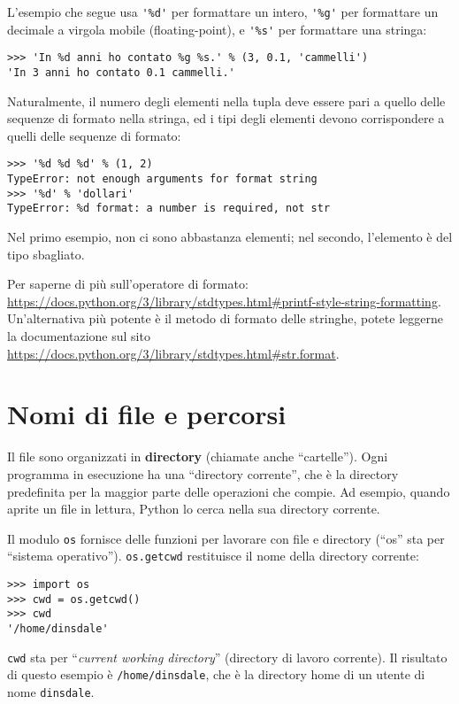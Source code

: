 \documentclass[10pt]{book}
\begin{document}
L'esempio che segue usa \verb"'%d'" per formattare un intero,
\verb"'%g'" per formattare un decimale a virgola mobile (floating-point), e \verb"'%s'" per formattare una stringa:

\begin{verbatim}
>>> 'In %d anni ho contato %g %s.' % (3, 0.1, 'cammelli')
'In 3 anni ho contato 0.1 cammelli.'
\end{verbatim}
%
Naturalmente, il numero degli elementi nella tupla deve essere pari a quello delle sequenze di formato nella stringa, ed i tipi degli elementi devono corrispondere a quelli delle sequenze di formato:

\begin{verbatim}
>>> '%d %d %d' % (1, 2)
TypeError: not enough arguments for format string
>>> '%d' % 'dollari'
TypeError: %d format: a number is required, not str
\end{verbatim}
%
Nel primo esempio, non ci sono abbastanza elementi; nel secondo, l'elemento è del tipo sbagliato.

Per saperne di più sull'operatore di formato: 
\url{https://docs.python.org/3/library/stdtypes.html#printf-style-string-formatting}. Un'alternativa più potente è il metodo di formato delle stringhe, potete leggerne la documentazione sul sito 
\url{https://docs.python.org/3/library/stdtypes.html#str.format}.


\section{Nomi di file e percorsi}
\label{paths}

Il file sono organizzati in {\bf directory} (chiamate anche ``cartelle'').
Ogni programma in esecuzione ha una ``directory corrente'', che è la directory predefinita per la maggior parte delle operazioni che compie.
Ad esempio, quando aprite un file in lettura, Python lo cerca nella sua directory corrente.

Il modulo {\tt os} fornisce delle funzioni per lavorare con file e directory (``os'' sta per ``sistema operativo'').  {\tt os.getcwd} restituisce il nome della directory corrente:

\begin{verbatim}
>>> import os
>>> cwd = os.getcwd()
>>> cwd
'/home/dinsdale'
\end{verbatim}
%
{\tt cwd} sta per ``{\em current working directory}'' (directory di lavoro corrente). 
Il risultato di questo esempio è {\tt /home/dinsdale}, che è la directory home di un utente di nome {\tt dinsdale}.
\end{document}
